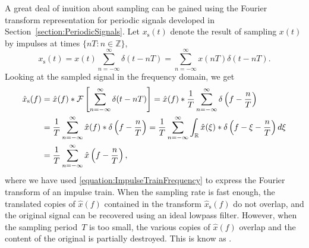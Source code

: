 A great deal of inuition about sampling can be gained using the Fourier transform representation for periodic signals developed in Section~\ref{section:PeriodicSignals}.
Let $x_{\mathrm{s}}(t)$ denote the result of sampling $x(t)$ by impulses at times $\{ nT : n \in \mathbb{Z} \}$,
\begin{equation*}
x_{\mathrm{s}}(t) = x(t) \sum_{n=-\infty}^{\infty} \delta(t-nT)
= \sum_{n=-\infty}^{\infty} x(nT) \delta(t-nT).
\end{equation*}
Looking at the sampled signal in the frequency domain, we get
\begin{equation*}\begin{split}
\hat{x}_{\mathrm{s}}(f) &= \hat{x}(f) \ast \mathcal{F} \left[ \sum_{n=-\infty}^{\infty} \delta(t-nT) \right]
= \hat{x}(f) \ast \frac{1}{T} \sum_{n=-\infty}^{\infty} \delta \left( f-\frac{n}{T} \right) \\
&= \frac{1}{T} \sum_{n=-\infty}^{\infty} \hat{x}(f) \ast \delta \left( f-\frac{n}{T} \right)
= \frac{1}{T} \sum_{n=-\infty}^{\infty} \int_{\mathbb{R}} \hat{x}(\xi) \ast \delta \left( f - \xi - \frac{n}{T} \right) d\xi \\
&= \frac{1}{T} \sum_{n=-\infty}^{\infty} \hat{x} \left( f - \frac{n}{T} \right) ,\end{split}\end{equation*}
where we have used \eqref{equation:ImpulseTrainFrequency} to express the Fourier transform of an impulse train.
When the sampling rate is fast enough, the translated copies of $\hat{x}(f)$ contained in the transform $\hat{x}_{\mathrm{s}}(f)$ do not overlap, and the original signal can be recovered using an ideal lowpass filter.
However, when the sampling period~$T$ is too small, the various copies of $\hat{x}(f)$ overlap and the content of the original is partially destroyed.
This is know as .

